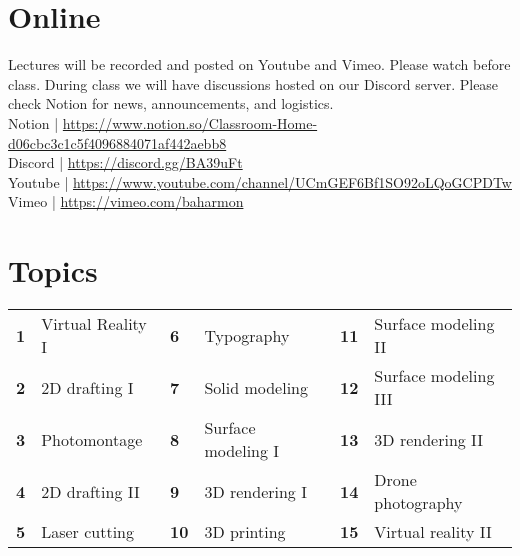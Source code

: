 \documentclass[11pt,article,oneside]{memoir}
\begin{document}

\section{Online}

Lectures will be recorded and posted 
on Youtube and Vimeo. 
Please watch before class.
During class we will have discussions 
hosted on our Discord server. 
Please check Notion
for news, announcements, and logistics.\\

\noindent
Notion | \url{https://www.notion.so/Classroom-Home-d06cbc3c1c5f4096884071af442aebb8}\\
Discord | \url{https://discord.gg/BA39uFt}\\
Youtube | \url{https://www.youtube.com/channel/UCmGEF6Bf1SO92oLQoGCPDTw}\\
Vimeo | \url{https://vimeo.com/baharmon}\\

\section{Topics}

\begin{table}[H]
\begin{tabular}{l l @{\hskip 0.5cm} l l @{\hskip 0.5cm} l l}
\small
\textbf{1} & Virtual Reality I & \textbf{6} & Typography & \textbf{11} & Surface modeling II\\
\textbf{2} & 2D drafting I & \textbf{7} & Solid modeling & \textbf{12} & Surface modeling III\\
\textbf{3} & Photomontage & \textbf{8} & Surface modeling I & \textbf{13} & 3D rendering II\\
\textbf{4} & 2D drafting II & \textbf{9} & 3D rendering I & \textbf{14} & Drone photography\\
\textbf{5} & Laser cutting & \textbf{10} & 3D printing & \textbf{15} & Virtual reality II\\
\end{tabular}
\end{table}

\end{document}
